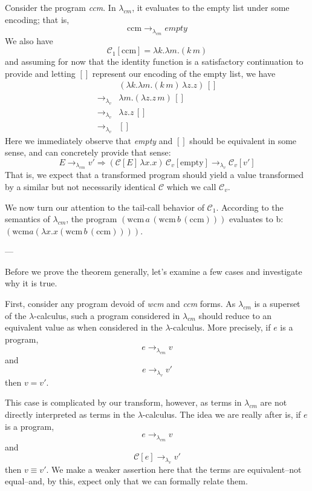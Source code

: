 \documentclass[ms,electronic,twosidetoc,letterpaper,chaptercenter,parttop]{byumsphd}
\begin{document}
Consider the program \emph{ccm}. In $\lambda_{cm}$, it evaluates to the empty list under 
some encoding; that is,
\[
\mathrm{ccm}\rightarrow_{\lambda_{cm}}empty
\]
We also have
\[
\mathcal{C}_{1}[\mathrm{ccm}]=\lambda k.\lambda m.(k\,m)
\]
and assuming for now that the identity function is a satisfactory continuation to provide 
and letting $[]$ represent our encoding of the empty list, we have
\begin{align*}
            &(\lambda k.\lambda m.(k\,m)\,\lambda z.z)\,[]\\
\rightarrow_{\lambda_{v}} &\lambda m.(\lambda z.z\,m)\,[]\\
\rightarrow_{\lambda_{v}} &\lambda z.z\,[]\\
\rightarrow_{\lambda_{v}} &[]
\end{align*}
Here we immediately observe that \emph{empty} and $[]$ should be equivalent in some
sense, and can concretely provide that sense:
\[
E\rightarrow_{\lambda_{cm}}v'\Rightarrow(\mathcal{C}[E]\,\lambda x.x)\,\mathcal{C}_{v}[\mathrm{empty}]\rightarrow_{\lambda_{v}}\mathcal{C}_{v}[v']
\]
That is, we expect that a transformed program should yield a value transformed by a
similar but not necessarily identical $\mathcal{C}$ which we call $\mathcal{C}_{v}$.


We now turn our attention to the tail-call behavior of $\mathcal{C}_{1}$. According to the 
semantics of $\lambda_{cm}$, the program 
$(\mathrm{wcm}\,a\,(\mathrm{wcm}\,b\,(\mathrm{ccm})))$ evaluates to b:
$(\mathrm{wcm} a (\lambda x.x (\mathrm{wcm}\,b\,(\mathrm{ccm}))))$. 

---

Before we prove the theorem generally, let's examine a few cases and investigate why it is 
true.

First, consider any program devoid of \emph{wcm} and \emph{ccm} forms. As $\lambda_{cm}$ is 
a superset of the $\lambda$-calculus, such a program considered in $\lambda_{cm}$ should 
reduce to an equivalent value as when considered in the $\lambda$-calculus. More precisely, 
if $e$ is a program,
\[
e\rightarrow_{\lambda_{cm}}v
\]
and
\[
e\rightarrow_{\lambda_{v}}v'
\]
then $v=v'$. 

This case is complicated by our transform, however, as terms in $\lambda_{cm}$ are not 
directly interpreted as terms in the $\lambda$-calculus. The idea we are really after is, 
if $e$ is a program,
\[
e\rightarrow_{\lambda_{cm}}v
\]
and
\[
\mathcal{C}[e]\rightarrow_{\lambda_{v}}v'
\]
then $v\equiv v'$. We make a weaker assertion here that the terms are equivalent--not 
equal--and, by this, expect only that we can formally relate them.
\end{document}
